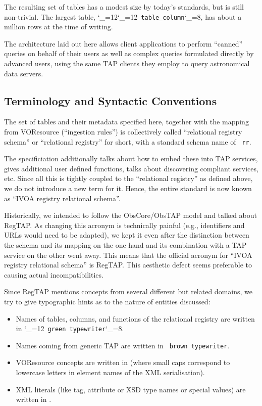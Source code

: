 \documentclass[11pt,a4paper]{ivoa}
\makeatletter
\def\rtent#1{\texttt{\color{rtcolor}\verb|#1|}}
\def\makeunderscoreletter{\catcode`\_=12}
\def\makeunderscoresubscript{\catcode`\_=8}
\def\rtent{\makeunderscoreletter\relax\rt@nt}
\def\rt@nt#1{\texttt{\color{rtcolor} #1}\makeunderscoresubscript{}}
\newcommand{\tapent}[1]{\texttt{\color{tapcolor} #1}}
\makeatother
\begin{document}
The resulting set of tables has a modest size by today's standards,
but is still non-trivial.  The largest table, \makeunderscoreletter\rtent{table_column},
has about a million rows at the time of writing.

The architecture laid out here allows client applications to perform ``canned''
queries on behalf of their users as well as complex queries formulated
directly by advanced users, using the same TAP clients they employ to
query astronomical data servers.


\subsection{Terminology and Syntactic Conventions}

\label{terms}

The set of tables and their metadata specified here, together with
the mapping from VOResource (``ingestion rules'') is collectively
called ``relational registry schema'' or ``relational registry'' for
short, with a standard schema name of \tapent{rr}.

The specificiation additionally talks about how to embed these into TAP
services, gives additional user defined functions, talks about
discovering compliant services, etc.  Since all this is tightly coupled
to the ``relational registry'' as defined above, we do not
introduce a new term for it.  Hence, the entire standard is now known as
``IVOA registry relational schema''.

Historically, we intended to follow the ObsCore/ObsTAP model and
talked about RegTAP.  As changing this acronym is technically painful
(e.g., identifiers and URLs would need to be adapted), we kept it even after
the distinction between the schema and its mapping on the one hand and
its combination with a TAP service on the other went away.  This
means that the official acronym for ``IVOA registry relational schema'' is
RegTAP.  This aesthetic defect seems preferable to causing actual
incompatibilities.

Since RegTAP mentions concepts from several different but related
domains, we try to give typographic hints as to the nature of entities
discussed:

\begin{itemize}
\item Names of tables, columns, and functions of the relational registry
are written in \rtent{green typewriter}.

\item Names coming from generic TAP are written in \tapent{brown
typewriter}.

\item VOResource concepts are written in 
(where small caps correspond to lowercase letters in element names of
the XML serialisation).

\item XML literals (like tag, attribute or XSD type names or special
values) are written in .

\end{itemize}
\end{document}
